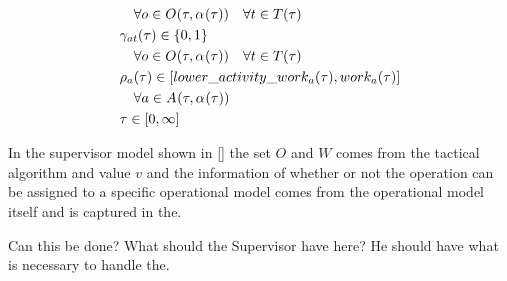\begin{alignat}{2}
	& \quad \forall o \in O_{}(\tau, \alpha_{}(\tau)) \quad \forall t \in T(\tau) \\
	& \gamma_{at}(\tau) \in \{0, 1\} \notag\\
	& \quad \forall o \in O_{}(\tau, \alpha_{}(\tau)) \quad \forall t \in T(\tau) \\ 
	& \rho_{a}(\tau) \in [lower\_activity\_work_{a}(\tau), work_{a}(\tau)] \notag\\
	& \quad \forall a \in A_{}(\tau, \alpha_{}(\tau)) \\
    & \tau \in  [0, \infty] 
\end{alignat}

In the supervisor model shown in \ref{} the set $O$ and $W$ comes from the tactical algorithm
and value $v$ and the information of whether or not the operation can be assigned to a 
specific operational model comes from the operational model itself and is captured in the.

Can this be done? What should the Supervisor have here? He should have what is necessary to
handle the. 
